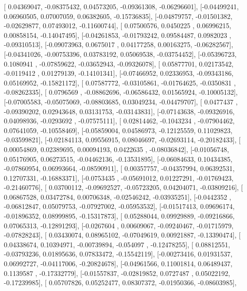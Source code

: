 \documentclass{article}
\begin{document}
       [ 0.04369047, -0.08375432,  0.04573205, -0.09361308, -0.06296601],
       [-0.04499241,  0.06960505,  0.07007059,  0.06382605, -0.15736835],
       [-0.04879757, -0.01501382, -0.02629877,  0.07493012, -0.11600744],
       [ 0.07500576,  0.0450225 ,  0.06996215,  0.00858154, -0.14047495],
       [-0.04261853, -0.01793242,  0.09584487,  0.0982023 , -0.09310513],
       [-0.09073963,  0.0675017 ,  0.04177258,  0.00163275, -0.06282567],
       [-0.04341026, -0.00753396,  0.03783192,  0.05069538, -0.03754452],
       [-0.05396723,  0.1080941 , -0.07859622, -0.03652943, -0.09326078],
       [ 0.05877701,  0.02173542, -0.0119412 ,  0.01279139, -0.14101341],
       [-0.07466952,  0.02336953, -0.09343186,  0.05169952, -0.15821172],
       [ 0.07587772, -0.03105861, -0.01764625, -0.0350831 , -0.08262335],
       [ 0.0796569 , -0.08862696, -0.06586432,  0.01565924, -0.10005132],
       [-0.07005583, -0.05075069, -0.08803685,  0.03049234, -0.04479707],
       [ 0.0477437 , -0.09390202,  0.02943648,  0.03131753, -0.03143831],
       [-0.07143638, -0.09326916,  0.04098936, -0.0293692 , -0.07575111],
       [ 0.02814462, -0.1043234 , -0.07904462,  0.07641059, -0.10558469],
       [-0.05859004,  0.04586973, -0.12125559,  0.11029823, -0.03599821],
       [-0.02184113,  0.09556915,  0.08046697, -0.02693114, -0.20182433],
       [ 0.00054869,  0.02389695,  0.00094193,  0.0422635 , -0.08036842],
       [-0.01056748,  0.05176905,  0.06273515, -0.04462136, -0.13531895],
       [-0.06084633,  0.10434385, -0.07860954,  0.06993664, -0.08590911],
       [ 0.00357757, -0.04357994,  0.06392531,  0.12707331, -0.16883371],
       [-0.0753435 , -0.05691012,  0.01227291, -0.01769423, -0.21460776],
       [ 0.03700112, -0.09692527, -0.05723205,  0.04204071, -0.03809216],
       [ 0.06867528,  0.03472784,  0.00706348, -0.02546242, -0.03935251],
       [-0.0442352 , -0.06812847,  0.05079753, -0.07927002, -0.05953532],
       [-0.01517413,  0.09696174, -0.01896352,  0.08999895, -0.15317873],
       [ 0.05288044,  0.09929889, -0.09216866,  0.07065313, -0.12891293],
       [-0.0267604 ,  0.00609067, -0.09240467, -0.01715979, -0.07828243],
       [ 0.03430074,  0.08965102, -0.07049619,  0.00921887, -0.13390474],
       [ 0.04338674,  0.10394971, -0.00739894, -0.054097  , -0.12478255],
       [ 0.08812551, -0.03793236,  0.01895636,  0.07833472, -0.15542119],
       [-0.00273416,  0.01931537,  0.06992727, -0.04117006, -0.20824678],
       [-0.04961566,  0.11001814,  0.06489437,  0.1139587 , -0.17332779],
       [-0.01557837, -0.02819852,  0.0727487 ,  0.05022192, -0.17239985],
       [ 0.05707826,  0.05252477,  0.08307372, -0.01950366, -0.08603985],
\end{document}
